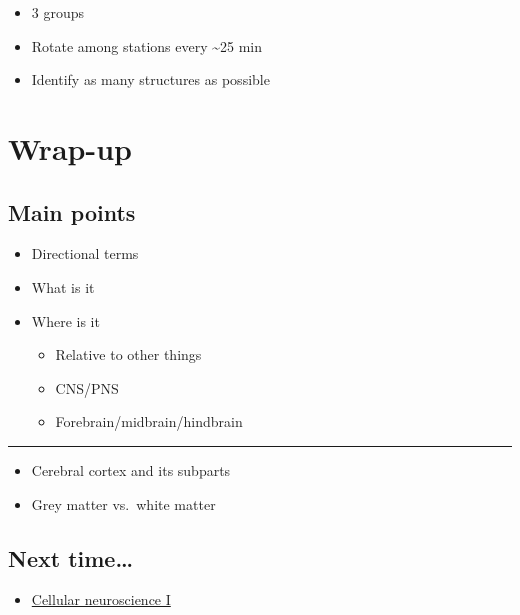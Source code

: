 \documentclass[
  letterpaper,
  DIV=11,
  numbers=noendperiod]{scrartcl}
\providecommand{\tightlist}{%
  \setlength{\itemsep}{0pt}\setlength{\parskip}{0pt}}\usepackage{longtable,booktabs,array}
\begin{document}
\begin{itemize}
\tightlist
\item
  3 groups
\item
  Rotate among stations every \textasciitilde25 min
\item
  Identify as many structures as possible
\end{itemize}

\section{Wrap-up}\label{wrap-up}

\subsection{Main points}\label{main-points}

\begin{itemize}
\tightlist
\item
  Directional terms
\item
  What is it
\item
  Where is it

  \begin{itemize}
  \tightlist
  \item
    Relative to other things
  \item
    CNS/PNS
  \item
    Forebrain/midbrain/hindbrain
  \end{itemize}
\end{itemize}

\begin{center}\rule{0.5\linewidth}{0.5pt}\end{center}

\begin{itemize}
\tightlist
\item
  Cerebral cortex and its subparts
\item
  Grey matter vs.~white matter
\end{itemize}

\subsection{Next time\ldots{}}\label{next-time}

\begin{itemize}
\tightlist
\item
  \href{wk03-2025-01-30.qmd}{Cellular neuroscience I}
\end{itemize}
\end{document}
